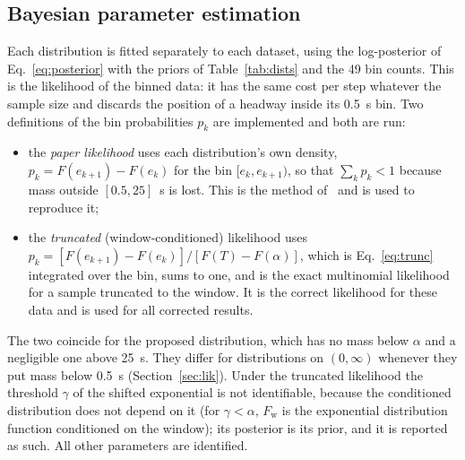 \documentclass[11pt,a4paper]{article}
\numberwithin{equation}{section}
\begin{document}
\subsection{Bayesian parameter estimation}\label{sec:bayes}
Each distribution is fitted separately to each dataset, using the log-posterior of Eq.~\eqref{eq:posterior} with the priors of
Table~\ref{tab:dists} and the 49 bin counts. This is the likelihood of the binned data: it has the same cost per step whatever the sample size and discards the position of a headway inside its 0.5~s bin.
Two definitions of the bin probabilities $p_k$ are implemented and both are run:
\begin{itemize}
  \item the \emph{paper likelihood} uses each distribution's own density, $p_k=F(e_{k+1})-F(e_k)$ for the bin $[e_k,e_{k+1})$, so
  that $\sum_kp_k<1$ because mass outside $[0.5,25]$~s is lost. This is the method of~\cite{leungbootnak} and is used to reproduce it;
  \item the \emph{truncated} (window-conditioned) likelihood uses $p_k=[F(e_{k+1})-F(e_k)]/[F(T)-F(\alpha)]$, which is Eq.~\eqref{eq:trunc} integrated over the bin, sums to one, and is the exact multinomial likelihood for a
  sample truncated to the window. It is the correct likelihood for these data and is used for all corrected results.
\end{itemize}
The two coincide for the proposed distribution, which has no mass below $\alpha$ and a negligible one above 25~s. They differ for distributions on $(0,\infty)$ whenever they put mass below 0.5~s (Section~\ref{sec:lik}).
Under the truncated likelihood the threshold $\gamma$ of the shifted exponential is not identifiable, because the conditioned distribution does not depend on it (for $\gamma<\alpha$, $F_{\mathrm w}$ is the exponential distribution function conditioned on the window); its posterior is its prior,
and it is reported as such. All other parameters are identified.
\end{document}
